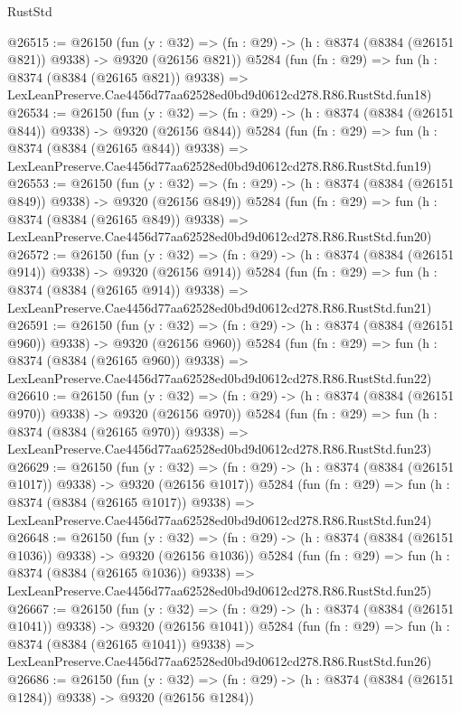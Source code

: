 \begin{lexlean}{RustStd}
\begin{coremodule}
@26515 := @26150
    (fun (y : @32) => (fn : @29) -> (h : @8374 (@8384 (@26151 @821)) @9338) -> @9320 (@26156 @821))
    @5284
    (fun (fn : @29) =>
    fun (h : @8374 (@8384 (@26165 @821)) @9338) =>
    LexLeanPreserve.Cae4456d77aa62528ed0bd9d0612cd278.R86.RustStd.fun18)
@26534 := @26150
    (fun (y : @32) => (fn : @29) -> (h : @8374 (@8384 (@26151 @844)) @9338) -> @9320 (@26156 @844))
    @5284
    (fun (fn : @29) =>
    fun (h : @8374 (@8384 (@26165 @844)) @9338) =>
    LexLeanPreserve.Cae4456d77aa62528ed0bd9d0612cd278.R86.RustStd.fun19)
@26553 := @26150
    (fun (y : @32) => (fn : @29) -> (h : @8374 (@8384 (@26151 @849)) @9338) -> @9320 (@26156 @849))
    @5284
    (fun (fn : @29) =>
    fun (h : @8374 (@8384 (@26165 @849)) @9338) =>
    LexLeanPreserve.Cae4456d77aa62528ed0bd9d0612cd278.R86.RustStd.fun20)
@26572 := @26150
    (fun (y : @32) => (fn : @29) -> (h : @8374 (@8384 (@26151 @914)) @9338) -> @9320 (@26156 @914))
    @5284
    (fun (fn : @29) =>
    fun (h : @8374 (@8384 (@26165 @914)) @9338) =>
    LexLeanPreserve.Cae4456d77aa62528ed0bd9d0612cd278.R86.RustStd.fun21)
@26591 := @26150
    (fun (y : @32) => (fn : @29) -> (h : @8374 (@8384 (@26151 @960)) @9338) -> @9320 (@26156 @960))
    @5284
    (fun (fn : @29) =>
    fun (h : @8374 (@8384 (@26165 @960)) @9338) =>
    LexLeanPreserve.Cae4456d77aa62528ed0bd9d0612cd278.R86.RustStd.fun22)
@26610 := @26150
    (fun (y : @32) => (fn : @29) -> (h : @8374 (@8384 (@26151 @970)) @9338) -> @9320 (@26156 @970))
    @5284
    (fun (fn : @29) =>
    fun (h : @8374 (@8384 (@26165 @970)) @9338) =>
    LexLeanPreserve.Cae4456d77aa62528ed0bd9d0612cd278.R86.RustStd.fun23)
@26629 := @26150
    (fun (y : @32) =>
    (fn : @29) -> (h : @8374 (@8384 (@26151 @1017)) @9338) -> @9320 (@26156 @1017))
    @5284
    (fun (fn : @29) =>
    fun (h : @8374 (@8384 (@26165 @1017)) @9338) =>
    LexLeanPreserve.Cae4456d77aa62528ed0bd9d0612cd278.R86.RustStd.fun24)
@26648 := @26150
    (fun (y : @32) =>
    (fn : @29) -> (h : @8374 (@8384 (@26151 @1036)) @9338) -> @9320 (@26156 @1036))
    @5284
    (fun (fn : @29) =>
    fun (h : @8374 (@8384 (@26165 @1036)) @9338) =>
    LexLeanPreserve.Cae4456d77aa62528ed0bd9d0612cd278.R86.RustStd.fun25)
@26667 := @26150
    (fun (y : @32) =>
    (fn : @29) -> (h : @8374 (@8384 (@26151 @1041)) @9338) -> @9320 (@26156 @1041))
    @5284
    (fun (fn : @29) =>
    fun (h : @8374 (@8384 (@26165 @1041)) @9338) =>
    LexLeanPreserve.Cae4456d77aa62528ed0bd9d0612cd278.R86.RustStd.fun26)
@26686 := @26150
    (fun (y : @32) =>
    (fn : @29) -> (h : @8374 (@8384 (@26151 @1284)) @9338) -> @9320 (@26156 @1284))

\end{coremodule}
\end{lexlean}

